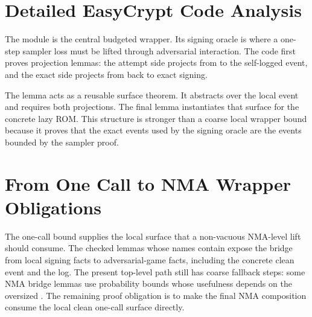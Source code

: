 \section{Detailed EasyCrypt Code Analysis}

The module  is the central
budgeted wrapper.  Its signing oracle  is where a one-step sampler
loss must be lifted through adversarial interaction.  The code first proves
projection lemmas: the attempt side projects from  to the
self-logged  event, and the exact side projects from
 back to exact signing.

The lemma
acts as a reusable surface theorem.  It abstracts over the local event and
requires both projections.  The final lemma
instantiates that surface for the concrete \haetae{} lazy ROM.  This structure
is stronger than a coarse local wrapper bound because it proves that the exact
events used by the signing oracle are the events bounded by the sampler proof.

\section{From One Call to NMA Wrapper Obligations}

The one-call bound supplies the local surface that a non-vacuous NMA-level lift
should consume.  The checked lemmas whose names contain
 expose the bridge from local signing facts to
adversarial-game facts, including the concrete clean event and the
 log.  The present top-level path still has coarse
fallback steps: some NMA bridge lemmas use probability bounds whose usefulness
depends on the oversized .  The remaining
proof obligation is to make the final NMA composition consume the local clean
one-call surface directly.
